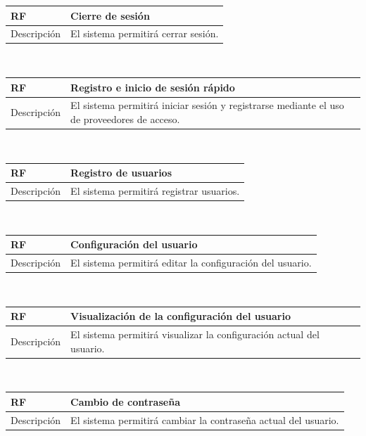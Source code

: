 \documentclass[twoside]{report}
\newcommand\addrow[2]{#1 &#2\\ }
\newcommand\addheading[2]{#1 &#2\\ \hline}
\newcommand\tabularhead{\begin{tabular}{lp{0.7\textwidth}}
\hline
}
\newenvironment{req}{\tabularhead}
{\hline\end{tabular}}
\begin{document}
\vspace{0.25cm}

\begin{req}
	\addheading{\textbf{RF\arabic{functionalRequirements}}}{Cierre de sesión}
	\addrow{Descripción}{El sistema permitirá cerrar sesión.}
\end{req} \\

\vspace{0.25cm}
 
\begin{req}
	\addheading{\textbf{RF\arabic{functionalRequirements}}}{Registro e inicio de sesión rápido}
	\addrow{Descripción}{El sistema permitirá iniciar sesión y registrarse mediante el uso de proveedores de acceso.}
\end{req} \\

\vspace{0.25cm}

\begin{req}
	\addheading{\textbf{RF\arabic{functionalRequirements}}}{Registro de usuarios}
	\addrow{Descripción}{El sistema permitirá registrar usuarios.}
\end{req}\\

\vspace{0.25cm}

\begin{req}
	\addheading{\textbf{RF\arabic{functionalRequirements}}}{Configuración del usuario}
	\addrow{Descripción}{El sistema permitirá editar la configuración del usuario.}
\end{req}\\

\vspace{0.25cm}

\begin{req}
	\addheading{\textbf{RF\arabic{functionalRequirements}}}{Visualización de la configuración del usuario}
	\addrow{Descripción}{El sistema permitirá visualizar la configuración actual del usuario.}
\end{req}\\

\vspace{0.25cm}

\begin{req}
	\addheading{\textbf{RF\arabic{functionalRequirements}}}{Cambio de contraseña}
	\addrow{Descripción}{El sistema permitirá cambiar la contraseña actual del usuario.}
\end{req}\\
\end{document}
